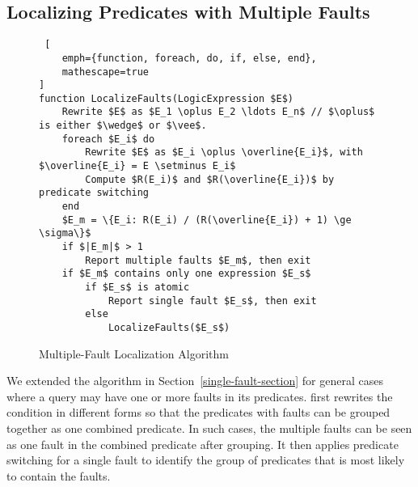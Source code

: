\subsection{Localizing Predicates with Multiple Faults}
\label{multi-fault-section}

\begin{figure}[t]
    \centering
\begin{lstlisting} [
    emph={function, foreach, do, if, else, end},
	mathescape=true
]
function LocalizeFaults(LogicExpression $E$)
    Rewrite $E$ as $E_1 \oplus E_2 \ldots E_n$ // $\oplus$ is either $\wedge$ or $\vee$.
    foreach $E_i$ do
        Rewrite $E$ as $E_i \oplus \overline{E_i}$, with $\overline{E_i} = E \setminus E_i$
        Compute $R(E_i)$ and $R(\overline{E_i})$ by predicate switching
    end
    $E_m = \{E_i: R(E_i) / (R(\overline{E_i}) + 1) \ge \sigma\}$
    if $|E_m|$ > 1
        Report multiple faults $E_m$, then exit
    if $E_m$ contains only one expression $E_s$
        if $E_s$ is atomic
            Report single fault $E_s$, then exit
        else
            LocalizeFaults($E_s$)
\end{lstlisting}
     \caption{Multiple-Fault Localization Algorithm}
     \label{fig:algorithm-multiplefaults}
\end{figure}


We extended the algorithm in Section~\ref{single-fault-section} for general cases
where a query may have one or more faults in its
predicates. \tool{} first rewrites the  condition
in different forms so that the predicates with faults can be grouped
together as one combined predicate. In such cases, the multiple faults
can be seen as one fault in the combined predicate after grouping. It
then applies predicate switching for a single fault to identify the
group of predicates that is most likely to contain the faults.

